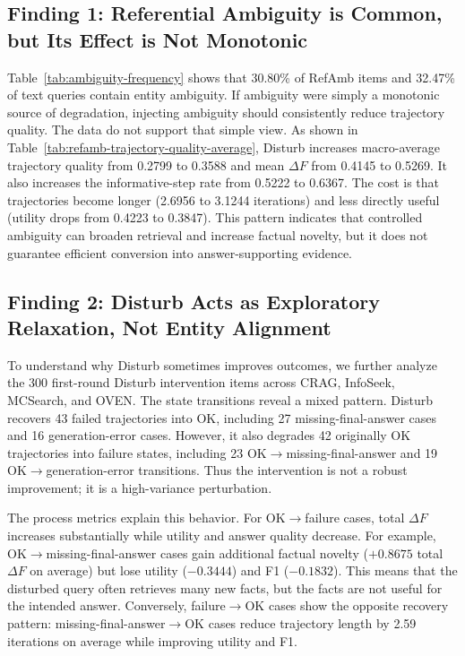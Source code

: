 \documentclass{article}
\newcommand{\df}{\Delta F}
\begin{document}
\subsection{Finding 1: Referential Ambiguity is Common, but Its Effect is Not Monotonic}
Table~\ref{tab:ambiguity-frequency} shows that 30.80\% of RefAmb items and 32.47\% of text queries contain entity ambiguity.
If ambiguity were simply a monotonic source of degradation, injecting ambiguity should consistently reduce trajectory quality.
The data do not support that simple view.
As shown in Table~\ref{tab:refamb-trajectory-quality-average}, Disturb increases macro-average trajectory quality from 0.2799 to 0.3588 and mean $\df$ from 0.4145 to 0.5269.
It also increases the informative-step rate from 0.5222 to 0.6367.
The cost is that trajectories become longer (2.6956 to 3.1244 iterations) and less directly useful (utility drops from 0.4223 to 0.3847).
This pattern indicates that controlled ambiguity can broaden retrieval and increase factual novelty, but it does not guarantee efficient conversion into answer-supporting evidence.



\subsection{Finding 2: Disturb Acts as Exploratory Relaxation, Not Entity Alignment}
To understand why Disturb sometimes improves outcomes, we further analyze the 300 first-round Disturb intervention items across CRAG, InfoSeek, MCSearch, and OVEN.
The state transitions reveal a mixed pattern.
Disturb recovers 43 failed trajectories into OK, including 27 missing-final-answer cases and 16 generation-error cases.
However, it also degrades 42 originally OK trajectories into failure states, including 23 OK$\rightarrow$missing-final-answer and 19 OK$\rightarrow$generation-error transitions.
Thus the intervention is not a robust improvement; it is a high-variance perturbation.

The process metrics explain this behavior.
For OK$\rightarrow$failure cases, total $\Delta F$ increases substantially while utility and answer quality decrease.
For example, OK$\rightarrow$missing-final-answer cases gain additional factual novelty ($+0.8675$ total $\Delta F$ on average) but lose utility ($-0.3444$) and F1 ($-0.1832$).
This means that the disturbed query often retrieves many new facts, but the facts are not useful for the intended answer.
Conversely, failure$\rightarrow$OK cases show the opposite recovery pattern: missing-final-answer$\rightarrow$OK cases reduce trajectory length by 2.59 iterations on average while improving utility and F1.
\end{document}
